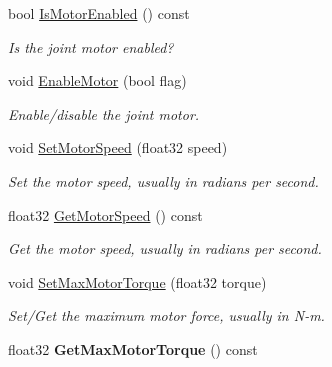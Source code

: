 \begin{DoxyCompactItemize}
bool \hyperlink{classb2WheelJoint_aef7948a18ec2784397a1d3745824cd78}{Is\+Motor\+Enabled} () const
\begin{DoxyCompactList}\small\item\em Is the joint motor enabled? \end{DoxyCompactList}\item 
\mbox{\label{classb2WheelJoint_a7a832d814bdda135a78fad41ba671da6}} 
void \hyperlink{classb2WheelJoint_a7a832d814bdda135a78fad41ba671da6}{Enable\+Motor} (bool flag)
\begin{DoxyCompactList}\small\item\em Enable/disable the joint motor. \end{DoxyCompactList}\item 
\mbox{\label{classb2WheelJoint_a6e3255fcf5c82b979ad7e3dc1c089c0b}} 
void \hyperlink{classb2WheelJoint_a6e3255fcf5c82b979ad7e3dc1c089c0b}{Set\+Motor\+Speed} (float32 speed)
\begin{DoxyCompactList}\small\item\em Set the motor speed, usually in radians per second. \end{DoxyCompactList}\item 
\mbox{\label{classb2WheelJoint_a47774ba5dfc1a6a5f15bcc651eea8127}} 
float32 \hyperlink{classb2WheelJoint_a47774ba5dfc1a6a5f15bcc651eea8127}{Get\+Motor\+Speed} () const
\begin{DoxyCompactList}\small\item\em Get the motor speed, usually in radians per second. \end{DoxyCompactList}\item 
\mbox{\label{classb2WheelJoint_a8aae3cd624ec9d48fc86c325c4595edc}} 
void \hyperlink{classb2WheelJoint_a8aae3cd624ec9d48fc86c325c4595edc}{Set\+Max\+Motor\+Torque} (float32 torque)
\begin{DoxyCompactList}\small\item\em Set/\+Get the maximum motor force, usually in N-\/m. \end{DoxyCompactList}\item 
\mbox{\label{classb2WheelJoint_a8e7dc36e5c59760f2807886d0acd514e}} 
float32 {\bfseries Get\+Max\+Motor\+Torque} () const
\item 

\end{DoxyCompactItemize}
